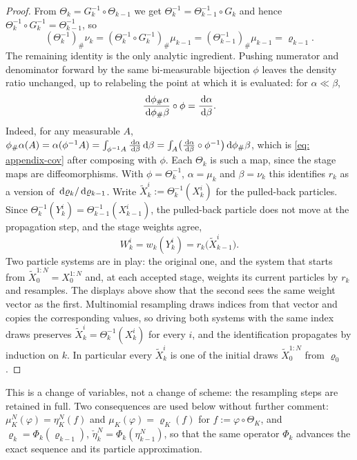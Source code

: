 \documentclass{article}
\begin{document}
\begin{proof}
From $\Theta_k = G_k^{-1}\circ\Theta_{k-1}$ we get $\Theta_k^{-1} = \Theta_{k-1}^{-1}\circ G_k$ and hence $\Theta_k^{-1}\circ G_k^{-1} = \Theta_{k-1}^{-1}$, so
\begin{equation*}
    (\Theta_k^{-1})_{\#}\nu_k = (\Theta_k^{-1}\circ G_k^{-1})_{\#}\mu_{k-1} = (\Theta_{k-1}^{-1})_{\#}\mu_{k-1} = \varrho_{k-1}.
\end{equation*}
The remaining identity is the only analytic ingredient. Pushing numerator and denominator forward by the same bi-measurable bijection $\phi$ leaves the density ratio unchanged, up to relabeling the point at which it is evaluated: for $\alpha\ll\beta$,
\begin{equation}
    \frac{\,\mathrm d\phi_{\#}\alpha}{\,\mathrm d\phi_{\#}\beta}\circ\phi = \frac{\,\mathrm d\alpha}{\,\mathrm d\beta} .
    \label{eq: appendix-cov}
\end{equation}
{\color{red}Indeed, for any measurable $A$, $\phi_{\#}\alpha(A)=\alpha(\phi^{-1}A)=\int_{\phi^{-1}A}\frac{\,\mathrm d\alpha}{\,\mathrm d\beta}\,\mathrm d\beta=\int_A\bigl(\frac{\,\mathrm d\alpha}{\,\mathrm d\beta}\circ\phi^{-1}\bigr)\,\mathrm d\phi_{\#}\beta$, which is \eqref{eq: appendix-cov} after composing with $\phi$.}
Each $\Theta_k$ is such a map, since the stage maps are diffeomorphisms. With $\phi=\Theta_k^{-1}$, $\alpha=\mu_k$ and $\beta=\nu_k$ this identifies $r_k$ as a version of $\,\mathrm d\varrho_k/\,\mathrm d\varrho_{k-1}$. Write $\tilde X_k^i := \Theta_k^{-1}(X_k^i)$ for the pulled-back particles. Since $\Theta_k^{-1}(Y_k^i) = \Theta_{k-1}^{-1}(X_{k-1}^i)$, the pulled-back particle does not move at the propagation step, and the stage weights agree,
\begin{equation*}
    W_k^i = w_k(Y_k^i) = r_k\bigl(\tilde X_{k-1}^i\bigr).
\end{equation*}
Two particle systems are in play: the original one, and the system that starts from $\tilde X_0^{1:N} = X_0^{1:N}$ and, at each accepted stage, weights its current particles by $r_k$ and resamples. The displays above show that the second sees the same weight vector as the first. Multinomial resampling draws indices from that vector and copies the corresponding values, so driving both systems with the same index draws preserves $\tilde X_k^i = \Theta_k^{-1}(X_k^i)$ for every $i$, and the identification propagates by induction on $k$. In particular every $\tilde X_k^i$ is one of the initial draws $\tilde X_0^{1:N}$ from $\varrho_0$.
\end{proof}

\noindent
This is a change of variables, not a change of scheme: the resampling steps are retained in full. {\color{red}Two consequences are used below without further comment: $\mu_K^N(\varphi)=\eta_K^N(f)$ and $\mu_K(\varphi)=\varrho_K(f)$ for $f:=\varphi\circ\Theta_K$, and $\varrho_k=\Phi_k(\varrho_{k-1})$, $\check\eta_k^N=\Phi_k(\eta_{k-1}^N)$, so that the same operator $\Phi_k$ advances the exact sequence and its particle approximation.}
\end{document}
